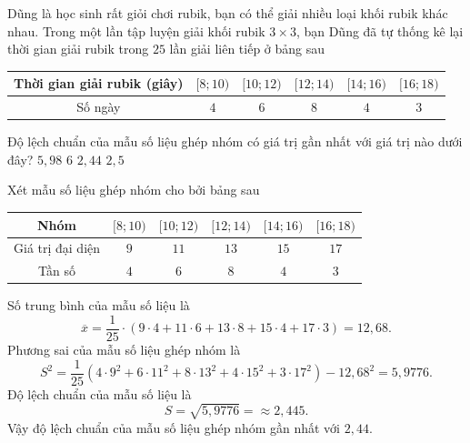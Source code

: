 \begin{ex}%
	Dũng là học sinh rất giỏi chơi rubik, bạn có thể giải nhiều loại khối rubik khác nhau. Trong một lần tập luyện giải khối rubik $3\times 3$, bạn Dũng đã tự thống kê lại thời gian giải	rubik trong $25$ lần giải liên tiếp ở bảng sau
	\begin{center}
		\begin{tabular}{|c|c|c|c|c|c|}
			\hline
			Thời gian giải rubik (giây)&$[8;10)$  & $[10;12)$ & $[12;14)$ & $[14;16)$ & $[16;18)$ \\
			\hline
			Số ngày	& $4$ & $6$ & $8$ & $4$ & $3$ \\
			\hline
		\end{tabular}
	\end{center}
	Độ lệch chuẩn của mẫu số liệu ghép nhóm có giá trị gần nhất với giá trị nào dưới đây?
	\choice 
	{$5{,}98$}
	{$6$}
	{\True $2{,}44$}
	{$2{,}5$}
	\loigiai 
	{
		Xét mẫu số liệu ghép nhóm cho bởi bảng sau
		\begin{center}
			\begin{tabular}{|c|c|c|c|c|c|}
				\hline
				Nhóm &$[8;10)$  & $[10;12)$ & $[12;14)$ & $[14;16)$ & $[16;18)$ \\
				\hline
				Giá trị đại diện & $9$ & $11$ & $13$ & $15$ & $17$ \\
				\hline
				Tần số	& $4$ & $6$ & $8$ & $4$ & $3$ \\
				\hline
			\end{tabular}
		\end{center}
		Số trung bình của mẫu số liệu là 
		$$\overline{x}=\dfrac{1}{25}\cdot (9\cdot 4+11\cdot 6+13\cdot 8+15\cdot 4+17\cdot 3)=12{,}68.$$
		Phương sai của mẫu số liệu ghép nhóm là 
		$$S^2=\dfrac{1}{25}\left(4\cdot 9^2+6\cdot 11^2+8\cdot 13^2+4\cdot 15^2+3\cdot 17^2\right)-12{,}68^2=5{,}9776.$$
		Độ lệch chuẩn của mẫu số liệu là 
		$$S=\sqrt{5{,}9776}=\approx 2{,}445.$$
		Vậy độ lệch chuẩn của mẫu số liệu ghép nhóm gần nhất với $2{,}44$.
	}
\end{ex}

